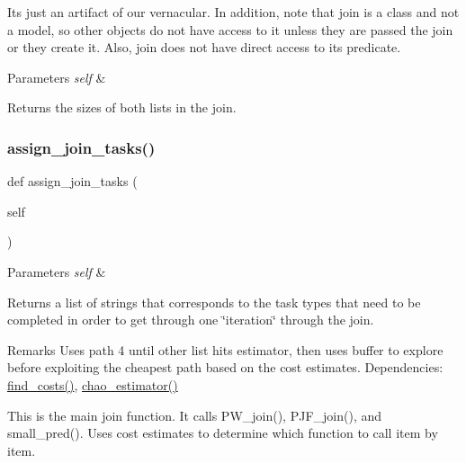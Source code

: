 It\textquotesingle{}s just an artifact of our vernacular. In addition, note that join is a class and not a model, so other objects do not have access to it unless they are passed the join or they create it. Also, join does not have direct access to its predicate. 
\begin{DoxyParams}{Parameters}
{\em self} & \\
\hline
\end{DoxyParams}
\begin{DoxyReturn}{Returns}
the sizes of both lists in the join. 
\end{DoxyReturn}
\mbox{\label{classdynamicfilterapp_1_1models_1_1_join_ad567a4773f2c57ad19df7e88ba5dc774}} 
\subsubsection{\texorpdfstring{assign\+\_\+join\+\_\+tasks()}{assign\_join\_tasks()}}
{\footnotesize\ttfamily def assign\+\_\+join\+\_\+tasks (\begin{DoxyParamCaption}\item[{}]{self }\end{DoxyParamCaption})}


\begin{DoxyParams}{Parameters}
{\em self} & \\
\hline
\end{DoxyParams}
\begin{DoxyReturn}{Returns}
a list of strings that corresponds to the task types that need to be completed in order to get through one \char`\"{}iteration\char`\"{} through the join. 
\end{DoxyReturn}
\begin{DoxyRemark}{Remarks}
Uses path 4 until other list hits estimator, then uses buffer to explore before exploiting the cheapest path based on the cost estimates. Dependencies\+: \hyperlink{classdynamicfilterapp_1_1models_1_1_join_ac9cef0d40608117205ed9d5118f5f87c}{find\+\_\+costs()}, \hyperlink{classdynamicfilterapp_1_1models_1_1_join_a582efaf16c8455e890ef61101a863966}{chao\+\_\+estimator()}\begin{DoxyVerb}This is the main join function. It calls PW_join(), PJF_join(), and small_pred(). Uses 
cost estimates to determine which function to call item by item.\end{DoxyVerb}
 
\end{DoxyRemark}
\mbox{\label{classdynamicfilterapp_1_1models_1_1_join_a582efaf16c8455e890ef61101a863966}} 
